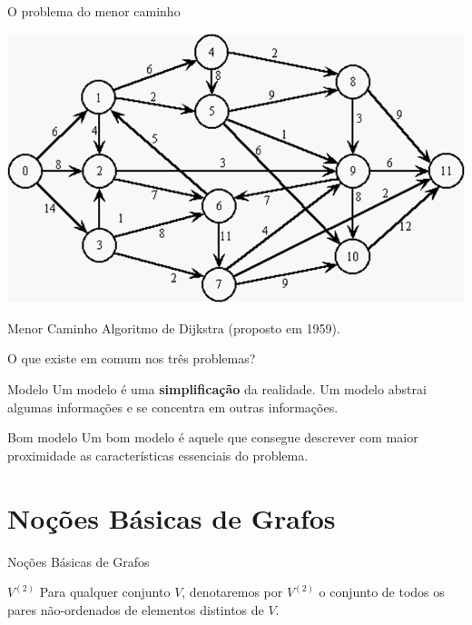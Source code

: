 \documentclass[xcolor=dvipsnames,table]{beamer}
\begin{document}
	\begin{frame}{O problema do menor caminho}
		\begin{center}
    		\includegraphics[height=.6\textheight]{images/redesGrafo.png}
  		\end{center}
		\begin{block}{Menor Caminho} \pause
			Algoritmo de Dijkstra (proposto em 1959).
		\end{block}
	\end{frame}
	
	\begin{frame}{O que existe em comum nos três problemas?} \pause
		\begin{block}{Modelo} \pause
			Um modelo é uma {\bf simplificação} da realidade. Um modelo abstrai algumas informações e se concentra em outras informações.
		\end{block} \pause
		\begin{block}{Bom modelo}
			Um bom modelo é aquele que consegue descrever com maior proximidade as características essenciais do problema.
		\end{block}
	\end{frame}
	
	\section{Noções Básicas de Grafos}	
	\begin{frame}{Noções Básicas de Grafos}
		\begin{block}{$V^{(2)}$}
			Para qualquer conjunto $V$, denotaremos por $V^{(2)}$ o conjunto de todos os pares não-ordenados de elementos distintos de $V$.
		\end{block}
	\end{frame}
	
	\begin{frame}
		\titlepage
	\end{frame}
	
\end{document}
